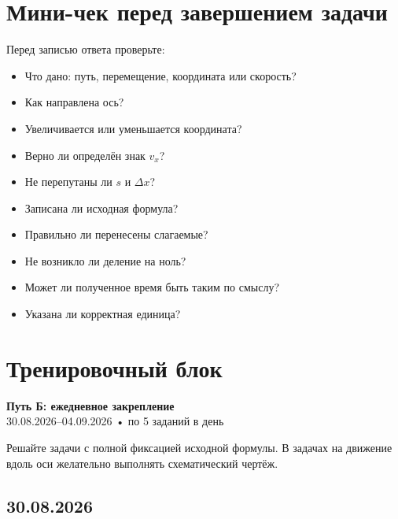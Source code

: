 \documentclass[a4paper,12pt]{article}
\begin{document}
\section{Мини-чек перед завершением задачи}

Перед записью ответа проверьте:

\begin{itemize}
  \item Что дано: путь, перемещение, координата или скорость?
  \item Как направлена ось?
  \item Увеличивается или уменьшается координата?
  \item Верно ли определён знак \(v_x\)?
  \item Не перепутаны ли \(s\) и \(\Delta x\)?
  \item Записана ли исходная формула?
  \item Правильно ли перенесены слагаемые?
  \item Не возникло ли деление на ноль?
  \item Может ли полученное время быть таким по смыслу?
  \item Указана ли корректная единица?
\end{itemize}

\clearpage

\section*{Тренировочный блок}

\begin{center}
{\large\bfseries Путь Б: ежедневное закрепление}\\[0.35em]
{\color{softgray}30.08.2026--04.09.2026 • по 5 заданий в день}
\end{center}

Решайте задачи с полной фиксацией исходной формулы. В задачах на движение вдоль оси желательно выполнять схематический чертёж.

\subsection*{30.08.2026}
\end{document}
